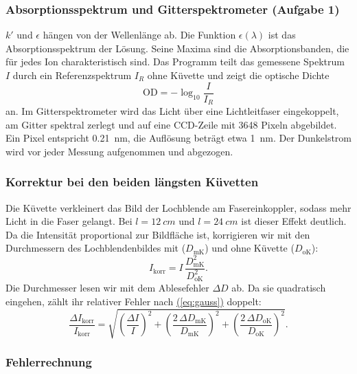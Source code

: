 \documentclass{article}
\let\OrigRef\ref
\renewcommand{\ref}[1]{{\color{linkblue}\uline{\OrigRef{#1}}}}
\renewcommand{\eqref}[1]{{\color{linkblue}\uline{\textup{(\OrigRef{#1})}}}}
\begin{document}
\subsubsection{Absorptionsspektrum und Gitterspektrometer (Aufgabe 1)}
\label{sec:spektrum}

$k'$ und $\epsilon$ hängen von der Wellenlänge ab. Die Funktion $\epsilon(\lambda)$ ist
das Absorptionsspektrum der Lösung. Seine Maxima sind die Absorptionsbanden, die für jedes
Ion charakteristisch sind. Das Programm teilt das gemessene Spektrum $I$ durch ein
Referenzspektrum $I_R$ ohne Küvette und zeigt die optische Dichte
\begin{equation}
	\mathrm{OD} = -\log_{10}\frac{I}{I_R}
	\label{eq:od}
\end{equation}
an. Im Gitterspektrometer wird das Licht über eine Lichtleitfaser eingekoppelt, am Gitter
spektral zerlegt und auf eine CCD-Zeile mit 3648 Pixeln abgebildet. Ein Pixel entspricht
\qty{0,21}{nm}, die Auflösung beträgt etwa \qty{1}{nm}. Der Dunkelstrom wird vor jeder
Messung aufgenommen und abgezogen.

\subsubsection{Korrektur bei den beiden längsten Küvetten}
\label{sec:korrektur}

Die Küvette verkleinert das Bild der Lochblende am Fasereinkoppler, sodass mehr Licht in
die Faser gelangt. Bei $l = \qty{12}{cm}$ und $l = \qty{24}{cm}$ ist dieser Effekt deutlich. Da die Intensität
proportional zur Bildfläche ist, korrigieren wir mit den Durchmessern des Lochblendenbildes
mit ($D_\mathrm{mK}$) und ohne Küvette ($D_\mathrm{oK}$):
\begin{equation}
	I_\mathrm{korr} = I\,\frac{D_\mathrm{mK}^2}{D_\mathrm{oK}^2} .
	\label{eq:korrektur}
\end{equation}
Die Durchmesser lesen wir mit dem Ablesefehler $\Delta D$ ab. Da sie quadratisch
eingehen, zählt ihr relativer Fehler nach \eqref{eq:gauss} doppelt:
\begin{equation}
	\frac{\Delta I_\mathrm{korr}}{I_\mathrm{korr}} =
	\sqrt{\left(\frac{\Delta I}{I}\right)^{2}
		+ \left(\frac{2\,\Delta D_\mathrm{mK}}{D_\mathrm{mK}}\right)^{2}
		+ \left(\frac{2\,\Delta D_\mathrm{oK}}{D_\mathrm{oK}}\right)^{2}} .
	\label{eq:fehler_korrektur}
\end{equation}

\subsubsection{Fehlerrechnung}
\label{sec:fehlerrechnung}
\end{document}
